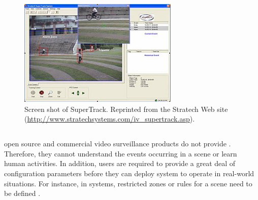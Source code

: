 \begin{figure}[t]
  \begin{center}
    \includegraphics[width=3in]{figures/supertrack.jpg}
    \caption[Screen shot of SuperTrack.]{\small Screen shot of
      SuperTrack. Reprinted from the Stratech Web site
      (\url{http://www.stratechsystems.com/iv_supertrack.asp}).}
    \label{fig:supertrack}
  \end{center}
\end{figure}

\DIFdelbegin \subsection{}

\addtocounter{subsection}{-1}%
\DIFdelend \DIFaddbegin {}\DIFaddend 

\DIFdelbegin {}\DIFdelend \DIFaddbegin \subsection{}

\DIFaddend open source and commercial video surveillance products \DIFdelbegin {}\DIFdelend \DIFaddbegin {}\DIFaddend do not provide \DIFdelbegin {}\DIFdelend \DIFaddbegin {}\DIFaddend . Therefore, they cannot understand the events occurring
in a scene or learn human activities. In addition, users are required
to provide a great deal of configuration parameters before they can
deploy \DIFdelbegin {}\DIFdelend \DIFaddbegin {}\DIFaddend system to operate in real-world situations. For instance, in
\DIFdelbegin {}\DIFdelend \DIFaddbegin {}\DIFaddend systems, restricted zones or rules for
a scene need to be defined \DIFdelbegin {}\DIFdelend \DIFaddbegin {}\DIFaddend .

